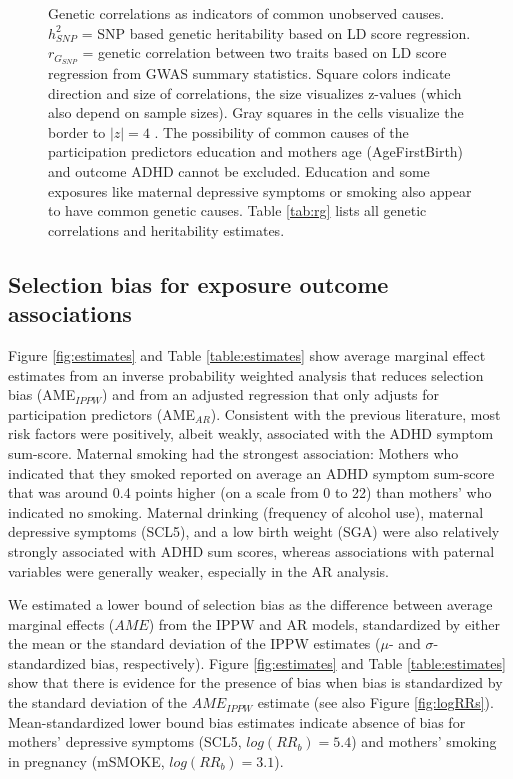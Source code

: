 \documentclass[12pt]{article}
\begin{document}
\begin{figure}
	\begin{center}
	\end{center}
	\caption{Genetic correlations as indicators of common unobserved causes. $h^2_{SNP}$ = SNP based genetic heritability based on LD score regression. $r_{G_{SNP}}$ = genetic correlation between two traits based on LD score regression from GWAS summary statistics. Square colors indicate direction and size of correlations, the size visualizes z-values (which also depend on sample sizes). Gray squares in the cells visualize the border to $|z|=4$ . The possibility of common causes of the participation predictors education and mothers age (AgeFirstBirth) and outcome ADHD cannot be excluded. Education and some exposures like maternal depressive symptoms or smoking also appear to have common genetic causes. Table \ref{tab:rg} lists all genetic correlations and heritability estimates.}
	\label{fig:rg}
\end{figure}

\subsection*{Selection bias for exposure outcome associations}
Figure \ref{fig:estimates} and Table \ref{table:estimates} show average marginal effect estimates from an inverse probability weighted analysis that reduces selection bias (AME$_{IPPW}$) and from an adjusted regression that only adjusts for participation predictors (AME$_{AR}$). Consistent with the previous literature, most risk factors were positively, albeit weakly, associated with the ADHD symptom sum-score. Maternal smoking had the strongest association: Mothers who indicated that they smoked reported on average an ADHD symptom sum-score that was around 0.4 points higher (on a scale from 0 to 22) than mothers' who indicated no smoking. Maternal drinking (frequency of alcohol use), maternal depressive symptoms (SCL5), and a low birth weight (SGA) were also relatively strongly associated with ADHD sum scores, whereas associations with paternal variables were generally weaker, especially in the AR analysis.

We estimated a lower bound of selection bias as the difference between average marginal effects ($AME$) from the IPPW and AR models, standardized by either the mean or the standard deviation of the IPPW estimates ($\mu$- and $\sigma$-standardized bias, respectively). Figure \ref{fig:estimates} and Table \ref{table:estimates} show that there is evidence for the presence of bias when bias is standardized by the standard deviation of the $AME_{IPPW}$ estimate (see also Figure \ref{fig:logRRs}). Mean-standardized lower bound bias estimates indicate absence of bias for mothers' depressive symptoms (SCL5, $log(RR_b)=5.4$) and mothers' smoking in pregnancy (mSMOKE, $log(RR_b)=3.1$). 
\end{document}
